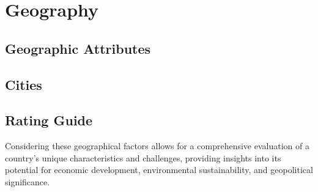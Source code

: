 \section{Geography}

\subsection{Geographic Attributes}

\subsection{Cities}

\subsection{Rating Guide}
Considering these geographical factors allows for a
comprehensive evaluation of a country's unique
characteristics and challenges, providing insights into
its potential for economic development, environmental
sustainability, and geopolitical significance.
